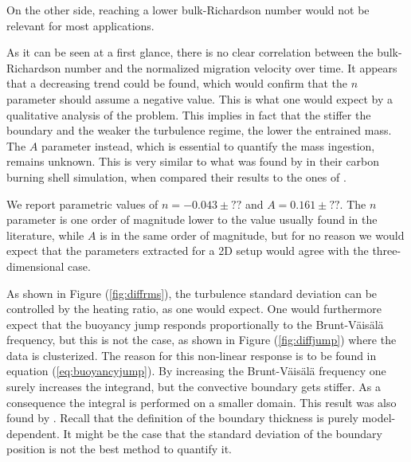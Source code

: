 On the other side, reaching a lower bulk-Richardson number would not be relevant for most applications.


As it can be seen at a first glance, there is no clear correlation between the bulk-Richardson number and the normalized migration velocity over time. It appears that a decreasing trend could be found, which would confirm that the $n$ parameter should assume a negative value. This is what one would expect by a qualitative analysis of the problem. This implies in fact that the stiffer the boundary and the weaker the turbulence regime, the lower the entrained mass. The $A$ parameter instead, which is essential to quantify the mass ingestion, remains unknown. This is very similar to what was found by \citet{cristini} in their carbon burning shell simulation, when compared their results to the ones of \citet{meakin}. 

We report parametric values of $n=-0.043 \pm ??$ and $A=0.161 \pm ??$. The $n$ parameter is one order of magnitude lower to the value usually found in the literature, while $A$ is in the same order of magnitude, but for no reason we would expect that the parameters extracted for a 2D setup would agree with the three-dimensional case.

As shown in Figure (\ref{fig:diffrms}), the turbulence standard deviation can be controlled by the heating ratio, as one would expect. One would furthermore expect that the buoyancy jump responds proportionally to the Brunt-Väisälä frequency, but this is not the case, as shown in Figure (\ref{fig:diffjump}) where the data is clusterized. The reason for this non-linear response is to be found in equation (\ref{eq:buoyancyjump}). By increasing the Brunt-Väisälä frequency one surely increases the integrand, but the convective boundary gets stiffer. As a consequence the integral is performed on a smaller domain. This result was also found by \citet{arnett2009}. Recall that the definition of the boundary thickness is purely model-dependent. It might be the case that the standard deviation of the boundary position is not the best method to quantify it.



